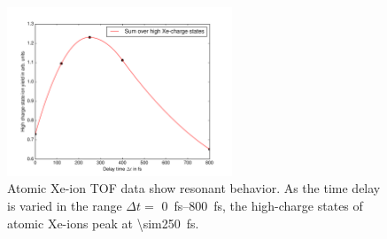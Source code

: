 \begin{figure}
	\centering
	\includegraphics[width=0.6\textwidth]{images/results/atomic-charge-state-time-resolved.pdf}
	\caption[Time-dependent response of atomic xenon in TOF spectroscopy.]{Atomic Xe-ion TOF data show resonant behavior. As the time delay is varied in the range $\Delta t=$ \SIrange{0}{800}{\femto\second}, the high-charge states of atomic Xe-ions peak at \SI{\sim250}{\femto\second}.}
	\label{fig:TOF-atomic-xenon-time-dependent}
\end{figure}
%
%
%
